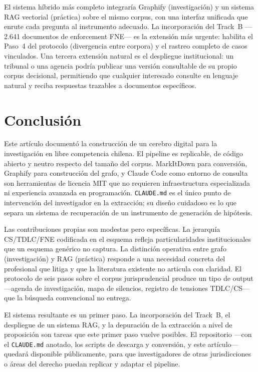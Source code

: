 \documentclass[12pt,a4paper]{article}
\begin{document}
El sistema híbrido más completo integraría Graphify (investigación) y un sistema
RAG vectorial (práctica) sobre el mismo corpus, con una interfaz unificada que
enrute cada pregunta al instrumento adecuado. La incorporación del Track~B
—2.641 documentos de enforcement FNE— es la extensión más urgente: habilita el
Paso~4 del protocolo (divergencia entre corpora) y el rastreo completo de casos
vinculados. Una tercera extensión natural es el despliegue institucional: un
tribunal o una agencia podría publicar una versión consultable de su propio
corpus decisional, permitiendo que cualquier interesado consulte en lenguaje
natural y reciba respuestas trazables a documentos específicos.

\section{Conclusión}

Este artículo documentó la construcción de un cerebro digital para la
investigación en libre competencia chilena. El pipeline es replicable, de código
abierto y neutro respecto del tamaño del corpus. MarkItDown para conversión,
Graphify para construcción del grafo, y Claude Code como entorno de consulta
son herramientas de licencia MIT que no requieren infraestructura especializada
ni experiencia avanzada en programación. \texttt{CLAUDE.md} es el único punto de
intervención del investigador en la extracción; su diseño cuidadoso es lo que
separa un sistema de recuperación de un instrumento de generación de hipótesis.

Las contribuciones propias son modestas pero específicas. La jerarquía
CS/TDLC/FNE codificada en el esquema refleja particularidades institucionales
que un esquema genérico no captura. La distinción operativa entre grafo
(investigación) y RAG (práctica) responde a una necesidad concreta del
profesional que litiga y que la literatura existente no articula con claridad.
El protocolo de seis pasos sobre el corpus jurisprudencial produce un tipo de
output —agenda de investigación, mapa de silencios, registro de tensiones
TDLC/CS— que la búsqueda convencional no entrega.

El sistema resultante es un primer paso. La incorporación del Track~B, el
despliegue de un sistema RAG, y la depuración de la extracción a nivel de
proposición son tareas que este primer paso vuelve posibles. El repositorio
—con el \texttt{CLAUDE.md} anotado, los scripts de descarga y conversión, y este
artículo— quedará disponible públicamente, para que investigadores de otras
jurisdicciones o áreas del derecho puedan replicar y adaptar el pipeline.
\end{document}
